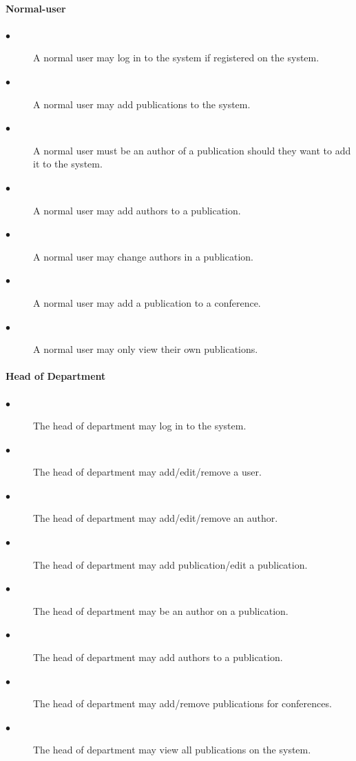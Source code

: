 \documentclass[a4paper]{article}
\begin{document}
	\paragraph{\textbf{Normal-user}}
	\begin{description}
		\item[$\bullet$] A normal user may log in to the system if registered on the system.
		\item[$\bullet$] A normal user may add publications to the system.
		\item[$\bullet$] A normal user must be an author of a publication should they want to add it to the system.
		\item[$\bullet$] A normal user may add authors to a publication.
		\item[$\bullet$] A normal user may change authors in a publication.
		\item[$\bullet$] A normal user may add a publication to a conference.
		\item[$\bullet$] A normal user may only view their own publications.
	\end{description}
	\paragraph{\textbf{Head of Department}}
	\begin{description}
		\item[$\bullet$] The head of department may log in to the system.
		\item[$\bullet$] The head of department may add/edit/remove a user.
		\item[$\bullet$] The head of department may add/edit/remove an author.
		\item[$\bullet$] The head of department may add publication/edit a publication.
		\item[$\bullet$] The head of department may be an author on a publication.
		\item[$\bullet$] The head of department may add authors to a publication.
		\item[$\bullet$] The head of department may add/remove publications for conferences.
		\item[$\bullet$] The head of department may view all publications on the system.
	\end{description}
\end{document}
